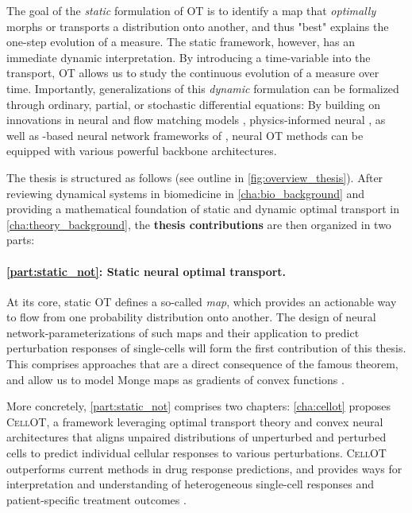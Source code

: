 The goal of the \emph{static} formulation of OT is to identify a map that \emph{optimally} morphs or transports a distribution onto another, and thus "best" explains the one-step evolution of a measure.
The static framework, however, has an immediate dynamic interpretation. By introducing a time-variable into the transport, OT allows us to study the continuous evolution of a measure over time. %
Importantly, generalizations of this \emph{dynamic} formulation can be formalized through ordinary, partial, or stochastic differential equations: By building on innovations in neural  \citep{chen2018neural} and flow matching models \citep{lipman2023flow, pooladian2023multisample, liu2022flow}, physics-informed neural  \citep{brandstetter2022message, raissi2019physics}, as well as -based neural network frameworks of , neural OT methods can be equipped with various powerful backbone architectures.

The thesis is structured as follows (see outline in \cref{fig:overview_thesis}).
After reviewing dynamical systems in biomedicine in \cref{cha:bio_background} and providing a mathematical foundation of static and dynamic optimal transport in \cref{cha:theory_background}, the \textbf{thesis contributions} are then organized in two parts:

\paragraph{\cref{part:static_not}: Static neural optimal transport.}

At its core, static OT defines a so-called \citeauthor{monge1781histoire} \textit{map}, which provides an actionable way to flow from one probability distribution onto another.
The design of neural network-parameterizations of such maps and their application to predict perturbation responses of single-cells will form the first contribution of this thesis.
This comprises approaches that are a direct consequence of the famous \citeauthor{brenier1987decomposition} theorem, and allow us to model Monge maps as gradients of convex functions \citep{bunne2021learning, bunne2022supervised}.

More concretely, \cref{part:static_not} comprises two chapters:
\cref{cha:cellot} proposes \textsc{CellOT}, a framework leveraging optimal transport theory and convex neural architectures that aligns unpaired distributions of unperturbed and perturbed cells to predict individual cellular responses to various perturbations. 
\textsc{CellOT} outperforms current methods in drug response predictions, and provides ways for interpretation and understanding of heterogeneous single-cell responses and patient-specific treatment outcomes \citep{bunne2021learning}. 

